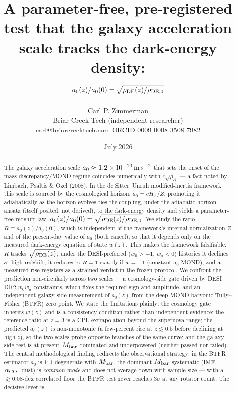 \documentclass[11pt,a4paper]{article}
\title{\bfseries A parameter-free, pre-registered test that the galaxy
acceleration scale tracks the dark-energy density:\\
$a_0(z)/a_0(0)=\sqrt{\rho_{\rm DE}(z)/\rho_{\rm DE,0}}$}
\author{Carl P. Zimmerman\\[2pt]
\normalsize Briar Creek Tech (independent researcher)\\
\normalsize \href{mailto:carl@briarcreektech.com}{carl@briarcreektech.com}
\;\textperiodcentered\;
ORCID \href{https://orcid.org/0009-0008-3508-7982}{0009-0008-3508-7982}}
\date{July 2026}
\newcommand{\Mbar}{M_{\rm bar}}
\newcommand{\rhoDE}{\rho_{\rm DE}}
\newcommand{\azero}{a_0}
\newcommand{\msms}{{\rm m\,s^{-2}}}
\begin{document}
\maketitle

\begin{abstract}
\noindent
The galaxy acceleration scale $\azero\approx1.2\times10^{-10}\,\msms$ that sets
the onset of the mass-discrepancy/MOND regime coincides numerically with
$c\sqrt{\rho_\Lambda}$ --- a fact noted by Limbach, Psaltis \& \"Ozel (2008).
In the de Sitter--Unruh modified-inertia framework this scale is sourced by the
cosmological horizon, $\azero=cH_\Lambda/Z$; promoting it adiabatically as the
horizon evolves ties the coupling, under the adiabatic-horizon ansatz (itself
posited, not derived), to the dark-energy density and yields a parameter-free
redshift law, $\azero(z)/\azero(0)=\sqrt{\rhoDE(z)/\rho_{\rm DE,0}}$. We study
the ratio $R\equiv \azero(z)/\azero(0)$, which is independent of the
framework's internal normalization $Z$ and of the present-day value of
$\azero$ (both cancel), so that it depends only on the measured dark-energy
equation of state $w(z)$. This makes the framework falsifiable: $R$ tracks
$\sqrt{\rhoDE(z)}$; under the DESI-preferred ($w_0>-1$, $w_a<0$) histories it
declines at high redshift, it reduces to $R=1$ exactly if $w=-1$ (constant-$\azero$
MOND), and a measured rise registers as a strained verdict in the frozen
protocol. We confront the prediction non-circularly across two scales --- a
cosmology-side gate driven by DESI DR2 $w_0w_a$ constraints, which fixes the
required sign and amplitude, and an independent galaxy-side measurement of
$\azero(z)$ from the deep-MOND baryonic Tully--Fisher (BTFR) zero point. We
state the limitations plainly: the cosmology gate inherits $w(z)$ and is a
consistency condition rather than independent evidence; the reference ratio at
$z=3$ is a CPL extrapolation beyond the supernova range; the predicted
$\azero(z)$ is non-monotonic (a few-percent rise at $z\lesssim0.5$ before
declining at high $z$), so the two scales probe opposite branches of the same
curve; and the galaxy-side test is at present $\Mbar$-dominated and
underpowered (neither passed nor failed). The central methodological finding
redirects the observational strategy: in the BTFR estimator $\azero$ is
$1{:}1$ degenerate with $\Mbar$, the dominant $\Mbar$ systematic
(IMF, $\alpha_{\rm CO}$, dust) is \emph{common-mode} and does not average down
with sample size --- with a $\gtrsim0.08$-dex correlated floor the BTFR test
never reaches $3\sigma$ at any rotator count. The decisive lever is

\end{abstract}
\end{document}
